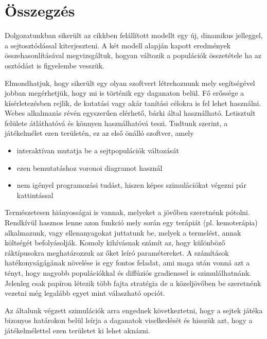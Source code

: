 \chapter{Összegzés}

Dolgozatunkban sikerült az \cite{archetti2016cooperation} cikkben felállított modellt egy új, dinamikus jelleggel, a sejtosztódással kiterjeszteni. A két modell alapján kapott eredmények összehasonlításával megvizsgáltuk, hogyan változik a populációk összetétele ha az osztódást is figyelembe vesszük.

Elmondhatjuk, hogy sikerült egy olyan szoftvert létrehoznunk mely segítségével jobban megérhetjük, hogy mi is történik egy daganaton belül. Fő erőssége a kísérletezésben rejlik, de kutatási vagy akár tanítási célokra is fel lehet használni. Webes alkalmazás révén egyszerűen elérhető, bárki által használható. Letisztult felülete átláthatóvá és könnyen használhatóvá teszi. Tudtunk szerint, a játékelmélet ezen területén, ez az első önálló szoftver, amely 
\begin{itemize}[noitemsep]
	\item interaktívan mutatja be a sejtpopulációk változását
	\item ezen bemutatáshoz voronoi diagramot használ
	\item nem igényel programozási tudást, hiszen képes szimulációkat végezni pár kattintással
\end{itemize}

Természetesen hiányosságai is vannak, melyeket a jövőben szeretnénk pótolni. Rendkívül hasznos lenne azon funkció mely során egy terápiát (pl. kemoterápia) alkalmazunk, vagy ellenanyagokat juttatunk be, melyek a termelést, annak költségét befolyásolják. Komoly kihívásnak számít az, hogy különböző ráktípusokra meghatározzuk az őket leíró paramétereket. A számítások hatékonyságágának növelése is egy fontos feladat, ami maga után vonná azt a tényt, hogy nagyobb populációkkal és diffúziós gradienssel is szimulálhatnánk. 
Jelenleg csak papíron létezik több fajta stratégia \cite{hummert2014evolutionary} de a közeljövőben be szeretnénk vezetni még legalább egyet mint válaszható opciót.

Az általunk végzett szimulációk arra engednek következtetni, hogy a sejtek játéka bizonyos határokon belül leírja a daganatok viselkedését és hisszük azt, hogy a játékelmélettel ezen területet ki lehet aknázni.

